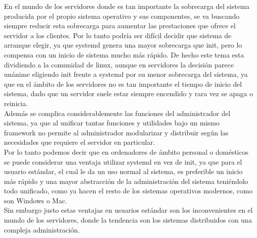 En el mundo de los servidores donde es tan importante la sobrecarga del sistema producida por el propio sistema operativo y sus componentes, se va buscando siempre reducir esta sobrecarga para aumentar las prestaciones que ofrece el servidor a los clientes. Por lo tanto podría ser difícil decidir que sistema de arranque elegir, ya que systemd genera una mayor sobrecarga que init, pero lo compensa con un inicio de sistema mucho más rápido. De hecho este tema esta dividiendo a la comunidad de linux, aunque en servidores la decisión parece unánime eligiendo init frente a systemd por su menor sobrecarga del sistema, ya que en el ámbito de los servidores no es tan importante el tiempo de inicio del sistema, dado que un servidor suele estar siempre encendido y rara vez se apaga o reinicia.\\

Además se complica considerablemente las funciones del administrador del sistema, ya que al unificar tantas funciones y utilidades bajo un mismo framework no permite al administrador modularizar y distribuir según las necesidades que requiere el servidor en particular.\\

Por lo tanto podemos decir que en ordenadores de ámbito personal o domésticos se puede considerar una ventaja utilizar systemd en vez de init, ya que para el usuario estándar, el cual le da un uso normal al sistema, es preferible un inicio más rápido y una mayor abstracción de la administración del sistema teniéndolo todo unificado, como ya hacen el resto de los sistemas operativos modernos, como son Windows o Mac.\\

Sin embargo justo estas ventajas en usuarios estándar son los inconvenientes en el mundo de los servidores, donde la tendencia son los sistemas distribuidos con una compleja administración.






